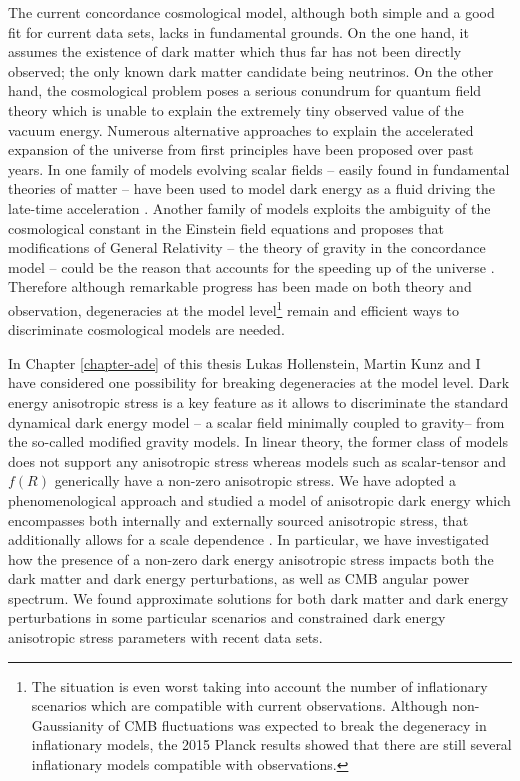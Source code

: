 The current concordance cosmological model, although both simple and a good fit for current data sets, lacks in fundamental grounds. On the one hand, it assumes the existence of dark matter which thus far has not been directly observed; the only known dark matter candidate being neutrinos. On the other hand, the cosmological problem poses a serious conundrum for quantum field theory which is unable to explain the extremely tiny observed value of the vacuum energy. Numerous alternative approaches to explain the accelerated expansion of the universe from first principles have been proposed over past years. In one family of models evolving scalar fields -- easily found in fundamental theories of matter -- have been used to model dark energy as a fluid driving the late-time acceleration \cite{Copeland:2006wr}. Another family of models exploits the ambiguity of the cosmological constant in the Einstein field equations and proposes that modifications of General Relativity -- the theory of gravity in the concordance model -- could be the reason that accounts for the speeding up of the universe \cite{Clifton:2011jh}. Therefore although remarkable progress has been made on both theory and observation, degeneracies at the model level\footnote{The situation is even worst taking into account the number of inflationary scenarios which are compatible with current observations. Although non-Gaussianity of CMB fluctuations was expected to break the degeneracy in inflationary models, the 2015 Planck results \cite{Ade:2015ava,Ade:2015lrj} showed that there are still several inflationary models compatible with observations.} remain and efficient ways to discriminate cosmological models are needed.   

In Chapter \ref{chapter-ade} of this thesis Lukas Hollenstein, Martin Kunz and I have considered one possibility for breaking degeneracies at the model level. Dark energy anisotropic stress is a key feature as it allows to discriminate the standard dynamical dark energy model -- a scalar field minimally coupled to gravity-- from the so-called modified gravity models. In linear theory, the former class of models does not support any anisotropic stress whereas models such as scalar-tensor and $f(R)$ generically have a non-zero anisotropic stress. We have adopted a phenomenological approach and studied a model of anisotropic dark energy which encompasses both internally and externally sourced anisotropic stress, that additionally allows for a scale dependence \cite{Cardona:2014iba}. In particular, we have investigated how the presence of a non-zero dark energy anisotropic stress impacts both the dark matter and dark energy perturbations, as well as CMB angular power spectrum. We found approximate solutions for both dark matter and dark energy perturbations in some particular scenarios and constrained dark energy anisotropic stress parameters with recent data sets. 

